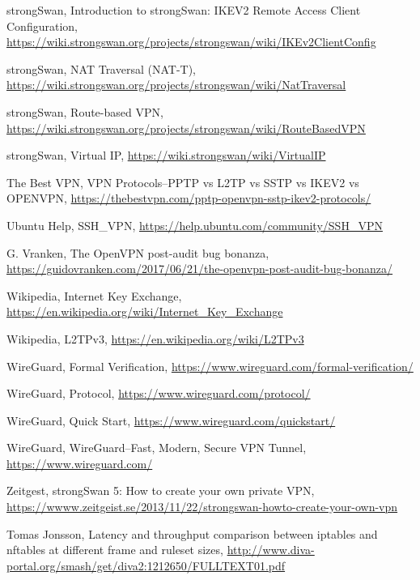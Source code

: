 \begin{thebibliography}{10}
  strongSwan, Introduction to strongSwan: IKEV2 Remote Access Client Configuration,
  \url{https://wiki.strongswan.org/projects/strongswan/wiki/IKEv2ClientConfig}

  strongSwan, NAT Traversal (NAT-T),
  \url{https://wiki.strongswan.org/projects/strongswan/wiki/NatTraversal}

  strongSwan, Route-based VPN,
  \url{https://wiki.strongswan.org/projects/strongswan/wiki/RouteBasedVPN}

  strongSwan, Virtual IP,
  \url{https://wiki.strongswan/wiki/VirtualIP}

  The Best VPN, VPN Protocols--PPTP vs L2TP vs SSTP vs IKEV2 vs OPENVPN,
  \url{https://thebestvpn.com/pptp-openvpn-sstp-ikev2-protocols/}

  Ubuntu Help, SSH\_VPN,
  \url{https://help.ubuntu.com/community/SSH_VPN}

  G. Vranken, The OpenVPN post-audit bug bonanza,
  \url{https://guidovranken.com/2017/06/21/the-openvpn-post-audit-bug-bonanza/}

  Wikipedia, Internet Key Exchange,
  \url{https://en.wikipedia.org/wiki/Internet_Key_Exchange}

  Wikipedia, L2TPv3,
  \url{https://en.wikipedia.org/wiki/L2TPv3}

  WireGuard, Formal Verification,
  \url{https://www.wireguard.com/formal-verification/}

  WireGuard, Protocol,
  \url{https://www.wireguard.com/protocol/}

  WireGuard, Quick Start,
  \url{https://www.wireguard.com/quickstart/}

  WireGuard, WireGuard--Fast, Modern, Secure VPN Tunnel,
  \url{https://www.wireguard.com/}

  Zeitgest, strongSwan 5: How to create your own private VPN,
  \url{https://wwww.zeitgeist.se/2013/11/22/strongswan-howto-create-your-own-vpn}

  Tomas Jonsson, Latency and throughput comparison between iptables and nftables
  at different frame and ruleset sizes,
  \url{http://www.diva-portal.org/smash/get/diva2:1212650/FULLTEXT01.pdf}

\end{thebibliography}
